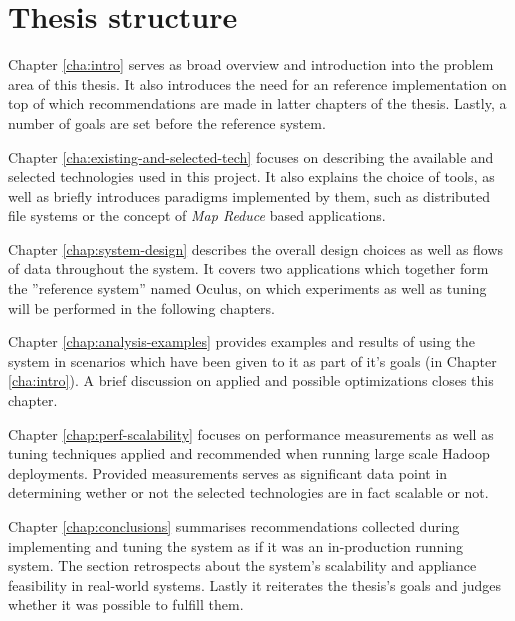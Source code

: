 \section{Thesis structure}
Chapter \ref{cha:intro} serves as broad overview and introduction into the problem area of this thesis. It also introduces the need for an reference implementation on top of which recommendations are made in latter chapters of the thesis. Lastly, a number of goals are set before the reference system.

Chapter \ref{cha:existing-and-selected-tech} focuses on describing the available and selected technologies used in this project. It also explains the choice of tools, as well as briefly introduces paradigms implemented by them, such as distributed file systems or the concept of \textit{Map Reduce} \cite{map-reduce} based applications.

Chapter \ref{chap:system-design} describes the overall design choices as well as flows of data throughout the system. It covers two applications which together form the ''reference system'' named Oculus, on which experiments as well as tuning will be performed in the following chapters.

Chapter \ref{chap:analysis-examples} provides examples and results of using the system in scenarios which have been given to it as part of it's goals (in Chapter \ref{cha:intro}). A brief discussion on applied and possible optimizations closes this chapter.

Chapter \ref{chap:perf-scalability} focuses on performance measurements as well as tuning techniques applied and recommended when running large scale Hadoop deployments. Provided measurements serves as significant data point in determining wether or not the selected technologies are in fact scalable or not.

Chapter \ref{chap:conclusions} summarises recommendations collected during implementing and tuning the system as if it was an in-production running system. The section retrospects about the system's scalability and appliance feasibility in real-world systems. Lastly it reiterates the thesis's goals and judges whether it was possible to fulfill them.






